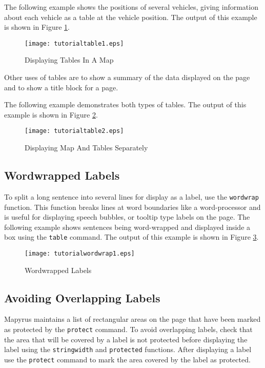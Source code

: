 The following example shows the positions of several vehicles,
giving information about each vehicle as a table at the vehicle
position.  The output of this example is shown in Figure \ref{tutorialtable1}.



\begin{figure}[htb]
\texttt{[image: tutorialtable1.eps]}
\caption{Displaying Tables In A Map}
\label{tutorialtable1}
\end{figure}

Other uses of tables are to show a summary of the data 
displayed on the page and to show a title block for a page.

The following example demonstrates both types of tables.
The output of this example is shown in Figure \ref{tutorialtable2}.



\begin{figure}[htb]
\texttt{[image: tutorialtable2.eps]}
\caption{Displaying Map And Tables Separately}
\label{tutorialtable2}
\end{figure}

\subsection{Wordwrapped Labels}

To split a long sentence into several lines for display as a label, use
the \texttt{wordwrap} function.
This function breaks lines at word boundaries like a word-processor
and is useful for displaying speech bubbles, or tooltip type
labels on the page.
The following example shows sentences being word-wrapped and
displayed inside a box using the \texttt{table} command.
The output of this example
is shown in Figure \ref{tutorialwordwrap1}.



\begin{figure}[htb]
\texttt{[image: tutorialwordwrap1.eps]}
\caption{Wordwrapped Labels}
\label{tutorialwordwrap1}
\end{figure}

\subsection{Avoiding Overlapping Labels}

Mapyrus maintains a list of rectangular
areas on the page that have been marked as protected by the
\texttt{protect} command.
To avoid overlapping labels, check that the area that will be
covered by a label is not protected before displaying the
label using the \texttt{stringwidth} and \texttt{protected} functions.
After displaying a label use the \texttt{protect} command to mark
the area covered by the label as protected.

